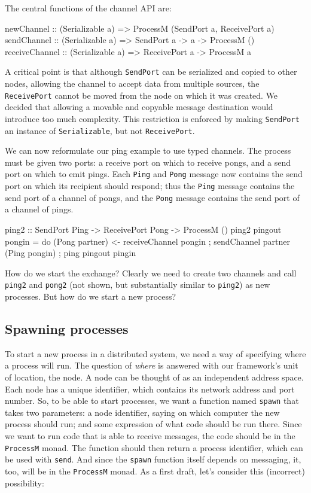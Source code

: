\documentclass[preprint]{sigplanconf}
\begin{document}
The central functions of the channel API are:

\begin{code}
newChannel :: (Serializable a) => ProcessM (SendPort a, ReceivePort a)
sendChannel :: (Serializable a) => SendPort a -> a -> ProcessM ()
receiveChannel :: (Serializable a) => ReceivePort a -> ProcessM a
\end{code}

A critical point is that although \texttt{SendPort} can be serialized and copied to other nodes, allowing the channel to accept data from multiple sources, the \texttt{ReceivePort} cannot be moved from the node on which it was created. We decided that allowing a movable and copyable message destination would introduce too much complexity. This restriction is enforced by making \texttt{SendPort} an instance of \texttt{Serializable}, but not \texttt{ReceivePort}. 

We can now reformulate our ping example to use typed channels. The process must be given two ports: a receive port on which to receive pongs, and a send port on which to emit pings. Each \texttt{Ping} and \texttt{Pong} message now contains the send port on which its recipient should respond; thus the \texttt{Ping} message contains the send port of a channel of pongs, and the \texttt{Pong} message contains the send port of a channel of pings.

\begin{code}
ping2 :: SendPort Ping -> ReceivePort Pong -> ProcessM ()
ping2 pingout pongin = 
   do { (Pong partner) <- receiveChannel pongin
      ; sendChannel partner (Ping pongin) 
      ; ping pingout pingin }
\end{code}

How do we start the exchange? Clearly we need to create two channels and call \texttt{ping2} and \texttt{pong2} (not shown, but substantially similar to \texttt{ping2}) as new processes. But how do we start a new process?

\subsection{Spawning processes}

To start a new process in a distributed system, we need a way of specifying where a process will run. The question of {\em where} is answered with our framework's unit of location, the node. A node can be thought of as an independent address space. Each node has a unique identifier, which contains its network address and port number. So, to be able to start processes, we want a function named \texttt{spawn} that takes two parameters: a node identifier, saying on which computer the new process should run; and some expression of what code should be run there. Since we want to run code that is able to receive messages, the code should be in the \texttt{ProcessM} monad. The function should then return a process identifier, which can be used with \texttt{send}. And since the \texttt{spawn} function itself depends on messaging, it, too, will be in the \texttt{ProcessM} monad. As a first draft, let's consider this (incorrect) possibility:
\end{document}
